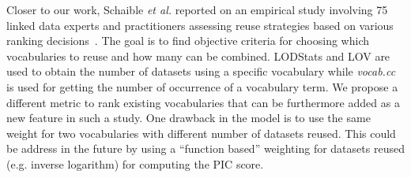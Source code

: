 Closer to our work, Schaible \emph{et al.} reported on an empirical study involving 75 linked data experts and practitioners assessing reuse strategies based on various ranking decisions~\cite{Schaible:ESWC14}. The goal is to find objective criteria for choosing which vocabularies to reuse and how many can be combined. LODStats and LOV are used to obtain the number of datasets using a specific vocabulary while \textit{vocab.cc} is used for getting the number of occurrence of a vocabulary term. We propose a different metric to rank existing vocabularies that can be furthermore added as a new feature in such a study. One drawback in the model is to use the same weight for two vocabularies with different number of datasets reused. This could be address in the future by using a ``function based'' weighting for datasets reused (e.g. inverse logarithm) for computing the PIC score.


